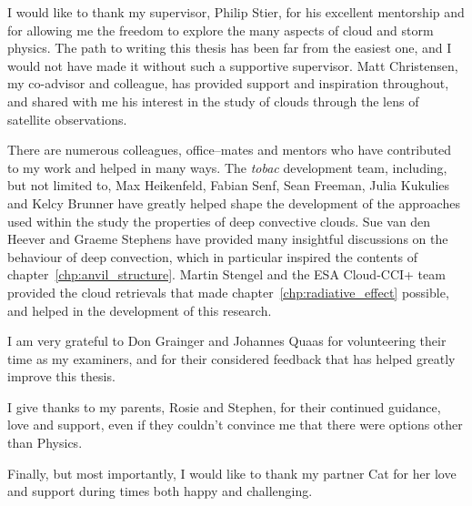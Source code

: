 \begin{acknowledgements}

I would like to thank my supervisor, Philip Stier, for his excellent mentorship and for allowing me the freedom to explore the many aspects of cloud and storm physics.
The path to writing this thesis has been far from the easiest one, and I would not have made it without such a supportive supervisor.
Matt Christensen, my co-advisor and colleague, has provided support and inspiration throughout, and shared with me his interest in the study of clouds through the lens of satellite observations.

There are numerous colleagues, office--mates and mentors who have contributed to my work and helped in many ways. 
The \textit{tobac} development team, including, but not limited to, Max Heikenfeld, Fabian Senf, Sean Freeman, Julia Kukulies and Kelcy Brunner have greatly helped shape the development of the approaches used within the study the properties of deep convective clouds.
Sue van den Heever and Graeme Stephens have provided many insightful discussions on the behaviour of deep convection, which in particular inspired the contents of chapter~\ref{chp:anvil_structure}.
Martin Stengel and the ESA Cloud-CCI+ team provided the cloud retrievals that made chapter~\ref{chp:radiative_effect} possible, and helped in the development of this research.

I am very grateful to Don Grainger and Johannes Quaas for volunteering their time as my examiners, and for their considered feedback that has helped greatly improve this thesis.

I give thanks to my parents, Rosie and Stephen, for their continued guidance, love and support, even if they couldn't convince me that there were options other than Physics.

Finally, but most importantly, I would like to thank my partner Cat for her love and support during times both happy and challenging.

\end{acknowledgements}

